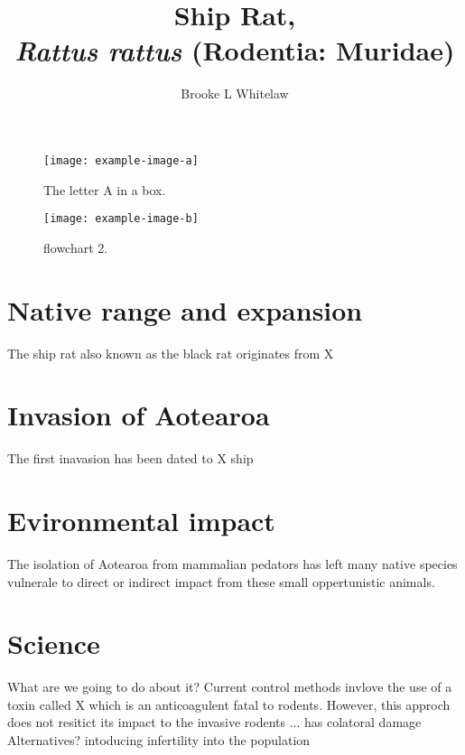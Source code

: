 \documentclass[twocolumn, letterpaper]{scrartcl}
\begin{document}
    \title{\color{triton_green}Ship Rat,\\ \textit{Rattus rattus} (Rodentia: Muridae)}
    \author{Brooke L Whitelaw}
    \date{}

	\maketitle
	
	
	\begin{figure}[tbp]
		\texttt{[image: example-image-a]}
		\caption{The letter A in a box. \label{fig:a}}
		\vspace{0.1in}
		\texttt{[image: example-image-b]}
		\caption{flowchart 2. \label{fig:b}}
	\end{figure}	
    
    \section*{Native range and expansion}

    	The ship rat also known as the black rat originates from X
        
    \section*{Invasion of Aotearoa}
        The first inavasion has been dated to X ship 
	
    
    \section*{Evironmental impact}
        The isolation of Aotearoa from mammalian pedators has left many native species vulnerale to direct or indirect impact from these small oppertunistic animals.

    \section*{Science}
        What are we going to do about it?
        Current control methods invlove the use of a toxin called X which is an anticoagulent fatal to rodents. However, this approch does not resitict its impact to the invasive rodents ... has colatoral damage 
        Alternatives? 
        intoducing infertility into the population 

    
    
    \begin{thebibliography}{9}
        

    \end{thebibliography}
    
	\blurb
\end{document}
